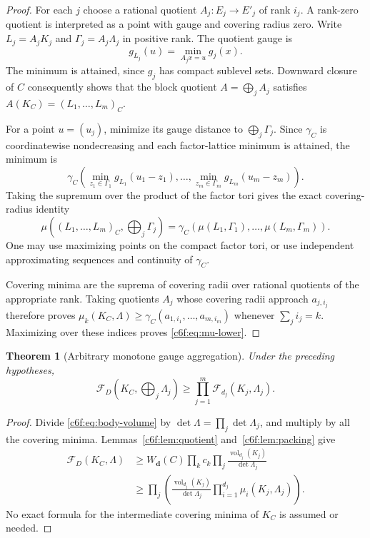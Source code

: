 \documentclass[11pt,a4paper]{article}
\newtheorem{theorem}{Theorem}[section]
\theoremstyle{remark}\newtheorem{remark}[theorem]{Remark}
\begin{document}
\begin{proof}
For each $j$ choose a rational quotient $A_j:E_j\to E'_j$ of
rank $i_j$.  A rank-zero quotient is interpreted as a point with
gauge and covering radius zero.  Write $L_j=A_jK_j$ and
$\Gamma_j=A_j\Lambda_j$ in positive rank.  The quotient gauge is
\[
 g_{L_j}(u)=\min_{A_jx=u}g_j(x).
\]
The minimum is attained, since $g_j$ has compact sublevel sets.
Downward closure of $C$ consequently shows that the block quotient
$A=\bigoplus_jA_j$ satisfies $A(K_C)=(L_1,\ldots,L_m)_C$.

For a point $u=(u_j)$, minimize its gauge distance to
$\bigoplus_j\Gamma_j$.  Since $\gamma_C$ is coordinatewise
nondecreasing and each factor-lattice minimum is attained, the
minimum is
\[
 \gamma_C\left(
     \min_{z_1\in\Gamma_1}g_{L_1}(u_1-z_1),\ldots,
     \min_{z_m\in\Gamma_m}g_{L_m}(u_m-z_m)\right).
\]
Taking the supremum over the product of the factor tori gives the
exact covering-radius identity
\begin{equation}\label{c6f:eq:radius}
 \mu((L_1,\ldots,L_m)_C,\bigoplus_j\Gamma_j)
   =\gamma_C(\mu(L_1,\Gamma_1),\ldots,
                  \mu(L_m,\Gamma_m)).
\end{equation}
One may use maximizing points on the compact factor tori, or use
independent approximating sequences and continuity of $\gamma_C$.

Covering minima are the suprema of covering radii over rational
quotients of the appropriate rank.  Taking quotients $A_j$ whose
covering radii approach $a_{j,i_j}$ therefore proves
$\mu_k(K_C,\Lambda)\ge\gamma_C(a_{1,i_1},\ldots,a_{m,i_m})$
whenever $\sum_ji_j=k$.  Maximizing over these indices proves
\eqref{c6f:eq:mu-lower}.
\end{proof}

\begin{theorem}[Arbitrary monotone gauge aggregation]
\label{c6f:thm:aggregation}
Under the preceding hypotheses,
\begin{equation}\label{c6f:eq:supermultiplicativity}
 \boxed{\quad
 \mathcal F_D(K_C,\bigoplus_j\Lambda_j)
       \ge\prod_{j=1}^m\mathcal F_{d_j}(K_j,\Lambda_j).
 \quad}
\end{equation}
\end{theorem}

\begin{proof}
Divide \eqref{c6f:eq:body-volume} by
$\det\Lambda=\prod_j\det\Lambda_j$, and multiply by all the
covering minima.  Lemmas~\ref{c6f:lem:quotient}
and~\ref{c6f:lem:packing} give
\begin{align*}
 \mathcal F_D(K_C,\Lambda)
 &\ge W_{\boldsymbol d}(C)\prod_kc_k
       \prod_j\frac{\operatorname{vol}_{d_j}(K_j)}{\det\Lambda_j}\\
 &\ge\prod_j\left(
       \frac{\operatorname{vol}_{d_j}(K_j)}{\det\Lambda_j}
         \prod_{i=1}^{d_j}\mu_i(K_j,\Lambda_j)\right).
\end{align*}
No exact formula for the intermediate covering minima of $K_C$
is assumed or needed.
\end{proof}
\end{document}
